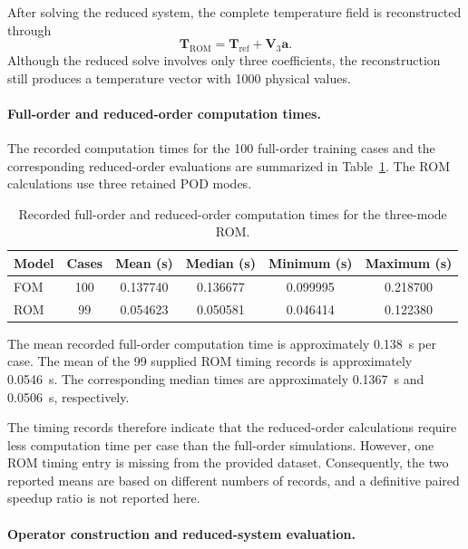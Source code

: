 After solving the reduced system, the complete
temperature field is reconstructed through
\[
\boxed{
\mathbf{T}_{\mathrm{ROM}}
=
\mathbf{T}_{\mathrm{ref}}+\mathbf{V}_3\mathbf{a}.
}
\]
Although the reduced solve involves only three
coefficients, the reconstruction still produces
a temperature vector with 1000 physical values.

\paragraph{Full-order and reduced-order computation times.}

The recorded computation times for the 100 full-order
training cases and the corresponding reduced-order
evaluations are summarized in
Table~\ref{tab:computational_time_comparison}.
The ROM calculations use three retained POD modes.

\begin{table}[htbp]
    \centering
    \caption{Recorded full-order and reduced-order
    computation times for the three-mode ROM.}
    \label{tab:computational_time_comparison}
    \begin{tabular}{lccccc}
        \toprule
        \textbf{Model} &
        \textbf{Cases} &
        \textbf{Mean (s)} &
        \textbf{Median (s)} &
        \textbf{Minimum (s)} &
        \textbf{Maximum (s)} \\
        \midrule
        FOM & 100 & 0.137740 & 0.136677 & 0.099995 & 0.218700 \\
        ROM & 99  & 0.054623 & 0.050581 & 0.046414 & 0.122380 \\
        \bottomrule
    \end{tabular}
\end{table}

The mean recorded full-order computation time is
approximately 0.138~s per case. The mean of the
99 supplied ROM timing records is approximately
0.0546~s. The corresponding median times are
approximately 0.1367~s and 0.0506~s, respectively.

The timing records therefore indicate that the
reduced-order calculations require less computation
time per case than the full-order simulations.
However, one ROM timing entry is missing from the
provided dataset. Consequently, the two reported
means are based on different numbers of records,
and a definitive paired speedup ratio is not
reported here.

\paragraph{Operator construction and reduced-system evaluation.}

